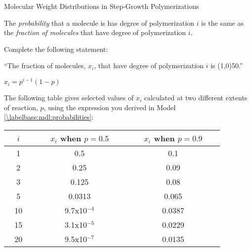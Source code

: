 \begin{activity}{Molecular Weight Distributions in Step-Growth Polymerizations}
\begin{ctqs}
\begin{enumerate}
		\end{enumerate}
		
\end{ctqs}

\begin{infobox}
	The \emph{probability} that a molecule is has degree of polymerization $i$ is the same as the \emph{fraction of molecules} that have degree of polymerization $i$.
\end{infobox}


\begin{ctqs}
	
	\question Complete the following statement:
	
		``The fraction of molecules, $x_i$, that have degree of polymerization $i$ is \line(1,0){50}.''
	
		\begin{solution}[0.5in]
		
			$x_i = p^{i-1}(1-p)$
			
		\end{solution}
		
\end{ctqs}

\begin{model}
\label{\labelbase:mdl:dist}

	The following table gives selected values of $x_i$ calculated at two different extents of reaction, $p$, using the expression you derived in Model \ref{\labelbase:mdl:probabilities}:
	
		\begin{center}
			\renewcommand{\arraystretch}{1.5}
			\begin{tabular}{ccc}
				\hline
				\textbf{~~$i$~~} & ~~~$x_i$ when $p=0.5$~~~ & ~~~$x_i$ when $p=0.9$~~~ \\\hline
				1 & 0.5 & 0.1 \\
				2 & 0.25 & 0.09 \\
				3 & 0.125 & 0.08 \\
				5 & 0.0313 & 0.065 \\
				10 & 9.7x10$^{-4}$ & 0.0387 \\
				15 & 3.1x10$^{-5}$ & 0.0229 \\
				20 & 9.5x10$^{-7}$ & 0.0135 \\\hline
			\end{tabular}
		\end{center}
		
		\vspace{0.1in}


\end{model}
\end{activity}

